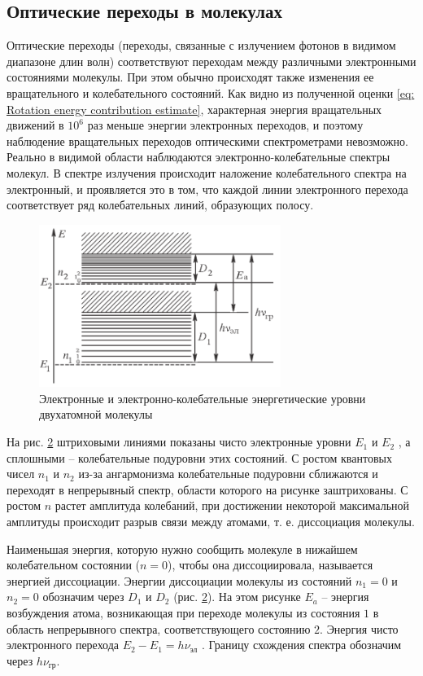 \documentclass[a4paper,12pt]{article}
\begin{document}
\subsection{Оптические переходы в молекулах}
Оптические переходы (переходы, связанные с излучением фотонов в видимом диапазоне длин волн) соответствуют переходам между различными электронными состояниями молекулы. При этом обычно происходят также изменения ее вращательного и колебательного состояний. Как видно из полученной оценки \eqref{eq: Rotation energy contribution estimate}, характерная энергия вращательных движений в $10^6$ раз меньше энергии электронных переходов, и поэтому наблюдение вращательных переходов оптическими спектрометрами невозможно. Реально в видимой области наблюдаются электронно-колебательные спектры молекул. В спектре излучения происходит наложение колебательного спектра на электронный, и проявляется это в том, что каждой линии электронного перехода соответствует ряд колебательных линий, образующих полосу.
\begin{figure}[H]\label{fig: Two-atom molecule energy levels}
    \centering
    \includegraphics[width = 0.7\textwidth]{Two-atom molecule energy levels.png}
    \caption{Электронные и электронно-колебательные энергетические уровни двухатомной молекулы}
\end{figure}
На рис. \hyperref[fig: Two-atom molecule energy levels]{2} штриховыми линиями показаны чисто электронные уровни $E_1$ и
$E_2$ , а сплошными -- колебательные подуровни этих состояний. С ростом квантовых чисел $n_1$ и $n_2$ из-за ангармонизма колебательные подуровни сближаются и переходят в непрерывный спектр, области которого на рисунке заштрихованы. С
ростом $n$ растет амплитуда колебаний, при достижении некоторой максимальной амплитуды происходит разрыв связи между атомами, т. е. диссоциация молекулы.

Наименьшая энергия, которую нужно сообщить молекуле в нижайшем колебательном состоянии ($n = 0$), чтобы она диссоциировала, называется энергией диссоциации. Энергии диссоциации молекулы из состояний $n_1 = 0$ и $n_2 = 0$ обозначим через $D_1$ и $D_2$ (рис. \hyperref[fig: Two-atom molecule energy levels]{2}). На этом рисунке $E_a$ -- энергия возбуждения атома, возникающая при переходе молекулы из состояния $1$ в область непрерывного спектра, соответствующего состоянию $2$. Энергия чисто электронного перехода $E_2 - E_1 = h\nu_\text{эл}$ . Границу схождения спектра обозначим через $h\nu_\text{гр}$.
\end{document}
